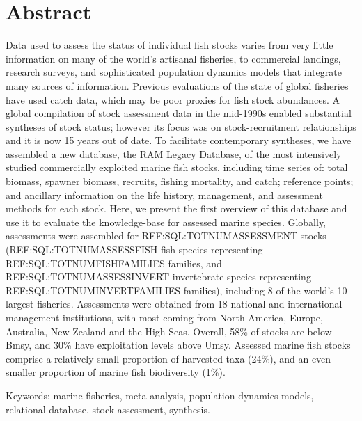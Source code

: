 \section*{Abstract}

Data used to assess the status of individual fish stocks varies from
very little information on many of the world's artisanal fisheries, to
commercial landings, research surveys, and sophisticated population
dynamics models that integrate many sources of information.  Previous
evaluations of the state of global fisheries have used catch data,
which may be poor proxies for fish stock abundances. A global
compilation of stock assessment data in the mid-1990s enabled
substantial syntheses of stock status; however its focus was on
stock-recruitment relationships and it is now 15 years out of date. To
facilitate contemporary syntheses, we have assembled a new database,
the RAM Legacy Database, of the most intensively studied commercially
exploited marine fish stocks, including time series of: total biomass,
spawner biomass, recruits, fishing mortality, and catch; reference
points; and ancillary information on the life history, management, and
assessment methods for each stock.  Here, we present the first
overview of this database and use it to evaluate the knowledge-base
for assessed marine species.  Globally, assessments were assembled for
REF:SQL:TOTNUMASSESSMENT stocks (REF:SQL:TOTNUMASSESSFISH fish species
representing REF:SQL:TOTNUMFISHFAMILIES families, and
REF:SQL:TOTNUMASSESSINVERT invertebrate species representing
REF:SQL:TOTNUMINVERTFAMILIES families), including 8 of the world's 10
largest fisheries. Assessments were obtained from 18 national and
international management institutions, with most coming from North
America, Europe, Australia, New Zealand and the High Seas.  Overall,
58\% of stocks are below Bmsy, and 30\% have exploitation levels above
Umsy.  Assessed marine fish stocks comprise a relatively small
proportion of harvested taxa (24\%), and an even smaller proportion of
marine fish biodiversity (1\%).



\noindent Keywords: marine fisheries, meta-analysis, population dynamics models, relational database, stock assessment, synthesis.

